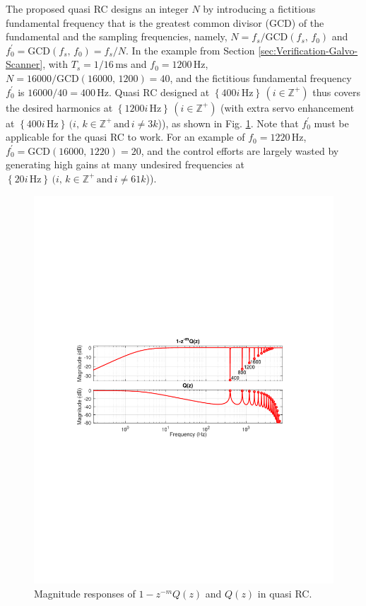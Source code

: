 \documentclass [11pt, proquest] {uwthesis}[2020/02/24]
\begin{document}
The proposed quasi RC designs an integer $N$ by introducing a fictitious
fundamental frequency that is the greatest common divisor (GCD) of
the fundamental and the sampling frequencies, namely, $N=f_{s}/\text{GCD}(f_{s},\,f_{0})$
and $f_{0}^{'}=\text{GCD}(f_{s},\,f_{0})=f_{s}/N$. In the example
from Section \ref{sec:Verification-Galvo-Scanner}, with $T_{s}=1/16\,\text{ms}$
and $f_{0}=1200\,\text{Hz}$, $N=16000/\text{GCD}(16000,\,1200)=40$,
and the fictitious fundamental frequency $f_{0}^{'}$ is $16000/40=400\,\text{Hz}$.
Quasi RC designed at $\left\{ 400i\,\text{Hz}\right\} \,(i\in\mathbb{Z}^{+})$
thus covers the desired harmonics at $\left\{ 1200i\,\text{Hz}\right\} \,(i\in\mathbb{Z}^{+})$
(with extra servo enhancement at $\left\{ 400i\,\text{Hz}\right\} \,(i,\,k\in\mathbb{Z}^{+}\,\text{and}\,i\neq3k$)),
as shown in Fig. \ref{fig:Q_quasi}. Note that $f_{0}^{'}$ must be
applicable for the quasi RC to work. For an example of $f_{0}=1220\,\text{Hz}$,
$f_{0}^{'}=\text{GCD}(16000,\,1220)=20$, and the control efforts
are largely wasted by generating high gains at many undesired frequencies
at $\left\{ 20i\,\text{Hz}\right\} \,(i,\,k\in\mathbb{Z}^{+}\,\text{and}\,i\neq61k$)).
\begin{figure}[!ht]
\begin{centering}
\includegraphics[width=14cm]{Fractional-order-RC/Q_quasi_RC}
\par\end{centering}
\caption{\label{fig:Q_quasi}Magnitude responses of $1-z^{-m}Q(z)$ and $Q(z)$
in quasi RC.}
\end{figure}
\end{document}
